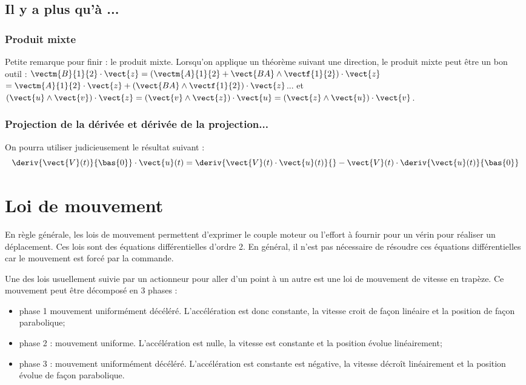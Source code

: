 \subsection{Il y a plus qu'à ...}
\subsubsection{Produit mixte}
Petite remarque pour finir : le produit mixte. Lorsqu'on applique un théorème suivant une direction, le produit mixte peut être un bon outil :
$\vectm{B}{1}{2}\cdot \vect{z} = \left( \vectm{A}{1}{2} + \vect{BA}\wedge \vectf{1}{2}\right)\cdot \vect{z}$
$=  \vectm{A}{1}{2}\cdot \vect{z} + \left(\vect{BA}\wedge \vectf{1}{2}\right)\cdot \vect{z}$...
et $\left(\vect{u} \wedge \vect{v}\right) \cdot \vect{z}= \left(\vect{v} \wedge \vect{z}\right) \cdot \vect{u}= \left(\vect{z} \wedge \vect{u}\right) \cdot \vect{v}$.

\subsubsection{Projection de la dérivée et dérivée de la projection...}
On pourra utiliser judicieusement le résultat suivant : 
$$
\deriv{\vect{V}(t)}{\bas{0}}\cdot \vect{u}(t) =
\deriv{\vect{V}(t) \cdot \vect{u}(t) }{} - \vect{V}(t) \cdot \deriv{\vect{u}(t)}{\bas{0}} 
$$

\section{Loi de mouvement}

En règle générale, les lois de mouvement permettent d'exprimer le couple moteur ou l'effort à fournir pour un vérin pour réaliser un déplacement. Ces lois sont des équations différentielles d'ordre 2. En général, il n'est pas nécessaire de résoudre ces équations différentielles car le mouvement est forcé par la commande. 

Une des lois usuellement suivie par un actionneur pour aller d'un point à un autre est une loi de mouvement de vitesse en trapèze.  Ce mouvement peut être décomposé en 3 phases : 
\begin{itemize}
\item phase 1 mouvement uniformément décéléré. L'accélération est donc constante, la vitesse croit de façon linéaire et la position de façon parabolique;
\item phase 2 : mouvement uniforme. L'accélération est nulle, la vitesse est constante et la position évolue linéairement;
\item phase 3 : mouvement uniformément décéléré. L'accélération est constante est négative, la vitesse décroît linéairement et la position évolue de façon parabolique. 
\end{itemize}

